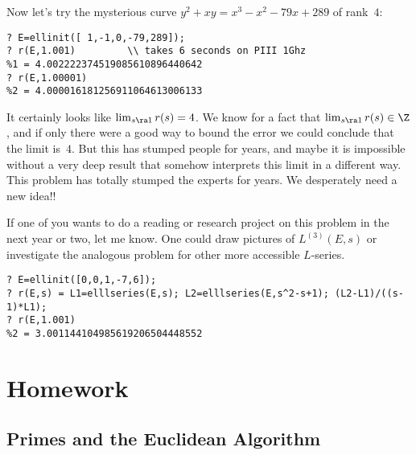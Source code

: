 \documentclass[11pt]{report}
\begin{document}
Now let's try the mysterious curve $y^2 +xy = x^3 - x^2 - 79x + 289$
of rank~$4$:
\begin{verbatim}
? E=ellinit([ 1,-1,0,-79,289]);
? r(E,1.001)         \\ takes 6 seconds on PIII 1Ghz
%1 = 4.002222374519085610896440642
? r(E,1.00001) 
%2 = 4.000016181256911064613006133
\end{verbatim}
It certainly looks like
$\lim_{s\ra 1} r(s) = 4$.
We know for a fact that
$\lim_{s\ra 1} r(s)\in\Z$,
and if only there were a good way to bound the
error we could conclude that
the limit is~$4$.   But this has stumped people for
years, and maybe it is impossible without a very deep
result that somehow interprets this limit in a different
way.  This problem has totally stumped the experts for years.
We desperately need a new idea!!

If one of you wants to do a reading or research project on this
problem in the next year or two, let me know.  One could draw
pictures of $L^{(3)}(E,s)$ or investigate the analogous problem
for other more accessible $L$-series.





\begin{verbatim}
? E=ellinit([0,0,1,-7,6]);
? r(E,s) = L1=elllseries(E,s); L2=elllseries(E,s^2-s+1); (L2-L1)/((s-1)*L1);
? r(E,1.001)
%2 = 3.001144104985619206504448552
\end{verbatim}




\chapter{Homework}
\section{Primes and the Euclidean Algorithm}
\end{document}
